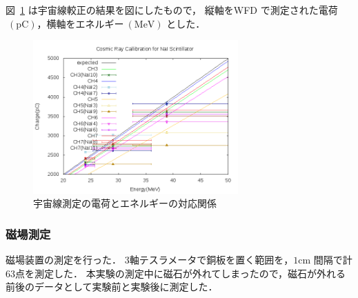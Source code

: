 図~\ref{cali} は宇宙線較正の結果を図にしたもので，
縦軸をWFD で測定された電荷$~(\mathrm{pC})$，横軸をエネルギー$~(\mathrm{MeV})$ とした．
\begin{figure}[H]
  \centering
      \includegraphics[width=0.7\textwidth]{figure/tajima/fit.png}
      \caption{宇宙線測定の電荷とエネルギーの対応関係}\label{cali}
\end{figure}
\newpage
\subsubsection{磁場測定}
磁場装置の測定を行った．
3軸テスラメータで銅板を置く範囲を，$1\mathrm{cm}$ 間隔で計63点を測定した．
本実験の測定中に磁石が外れてしまったので，磁石が外れる前後のデータとして実験前と実験後に測定した．

